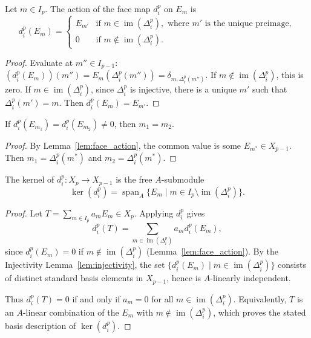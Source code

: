 \begin{lemma}\label{lem:face_action}
Let $m \in I_p$. The action of the face map $d_i^p$ on $E_{m}$ is
\[
d_i^p(E_{m}) =
\begin{cases}
E_{m'} & \text{if } m \in \operatorname{im}(\Delta_i^p), \text{ where } m' \text{ is the unique preimage},\\[4pt]
0      & \text{if } m \notin \operatorname{im}(\Delta_i^p).
\end{cases}
\]
\end{lemma}
\begin{proof}
Evaluate at $m'' \in I_{p-1}$: $(d_i^p(E_{m}))(m'') = E_{m}(\Delta_i^p(m'')) = \delta_{m, \Delta_i^p(m'')}$. If $m \notin \operatorname{im}(\Delta_i^p)$, this is zero. If $m \in \operatorname{im}(\Delta_i^p)$, since $\Delta_i^p$ is injective, there is a unique $m'$ such that $\Delta_i^p(m')=m$. Then $d_i^p(E_{m}) = E_{m'}$.
\end{proof}

\begin{lemma}\label{lem:injectivity}
If $d_i^p(E_{m_1}) = d_i^p(E_{m_2}) \ne 0$, then $m_1 = m_2$.
\end{lemma}
\begin{proof}
By Lemma~\ref{lem:face_action}, the common value is some $E_{m^*} \in X_{p-1}$. Then $m_1 = \Delta_i^p(m^*)$ and $m_2 = \Delta_i^p(m^*)$.
\end{proof}

\begin{theorem}\label{thm:kernel_basis}
The kernel of $d_i^p: X_p \to X_{p-1}$ is the free $A$-submodule
\[
\ker(d_i^p) = \operatorname{span}_A\{E_{m} \mid m \in I_p \setminus \operatorname{im}(\Delta_i^p)\}.
\]
\end{theorem}
\begin{proof}
Let $T = \sum_{m \in I_p} a_{m} E_{m} \in X_p$. Applying $d_i^p$ gives
\[
d_i^p(T) = \sum_{m \in \operatorname{im}(\Delta_i^p)} a_{m} d_i^p(E_{m}),
\]
since $d_i^p(E_{m})=0$ if $m \notin \operatorname{im}(\Delta_i^p)$ (Lemma~\ref{lem:face_action}). By the Injectivity Lemma~\ref{lem:injectivity}, the set $\{d_i^p(E_{m}) \mid m \in \operatorname{im}(\Delta_i^p)\}$ consists of distinct standard basis elements in $X_{p-1}$, hence is $A$-linearly independent.

Thus $d_i^p(T)=0$ if and only if $a_{m} = 0$ for all $m \in \operatorname{im}(\Delta_i^p)$.
Equivalently, $T$ is an $A$-linear combination of the $E_m$ with $m\notin \operatorname{im}(\Delta_i^p)$, which proves the stated basis description of $\ker(d_i^p)$.
\end{proof}




